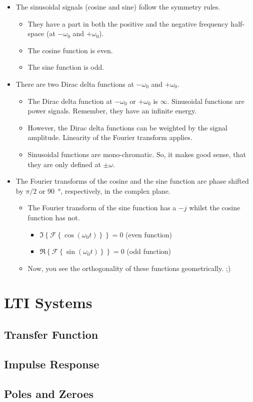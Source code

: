 \begin{refsection}
\begin{itemize}
	\item The sinusoidal signals (cosine and sine) follow the symmetry rules.
	\begin{itemize}
		\item They have a part in both the positive and the negative frequency half-space (at $- \omega_0$ and $+ \omega_0$).
		\item The cosine function is even.
		\item The sine function is odd.
	\end{itemize}
	\item There are two Dirac delta functions at $- \omega_0$ and $+ \omega_0$.
	\begin{itemize}
		\item The Dirac delta function at $- \omega_0$ or $+ \omega_0$ is $\infty$. Sinusoidal functions are power signals. Remember, they have an infinite energy.
		\item However, the Dirac delta functions can be weighted by the signal amplitude. Linearity of the Fourier transform applies.
		\item Sinusoidal functions are mono-chromatic. So, it makes good sense, that they are only defined at $\pm \omega$.
	\end{itemize}
	\item The Fourier transforms of the cosine and the sine function are phase shifted by $\pi/2$ or \SI{90}{\degree}, respectively, in the complex plane.
	\begin{itemize}
		\item The Fourier transform of the sine function has a $-j$ whilst the cosine function has not.
		\begin{itemize}
			\item $\Im\left\{\mathcal{F} \left\{\cos\left(\omega_0 t\right)\right\}\right\} = 0$ (even function)
			\item $\Re\left\{\mathcal{F} \left\{\sin\left(\omega_0 t\right)\right\}\right\} = 0$ (odd function)
		\end{itemize}
		\item Now, you see the orthogonality of these functions geometrically. ;)
	\end{itemize}
\end{itemize}


\section{\acs{LTI} Systems}

\subsection{Transfer Function}

\subsection{Impulse Response}


\subsection{Poles and Zeroes}

\printbibliography[heading=subbibliography]
\end{refsection}

